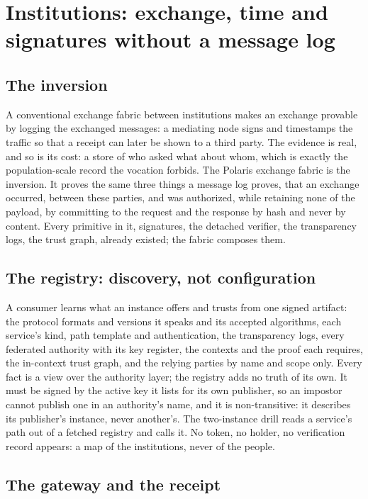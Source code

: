 \section{Institutions: exchange, time and signatures without a message log}
\label{sec:institutions}

\subsection{The inversion}

A conventional exchange fabric between institutions makes an exchange provable by logging the
exchanged messages: a mediating node signs and timestamps the traffic so that a receipt can later be
shown to a third party. The evidence is real, and so is its cost: a store of who asked what about
whom, which is exactly the population-scale record the vocation forbids. The Polaris exchange fabric
is the inversion. It proves the same three things a message log proves, that an exchange occurred,
between these parties, and was authorized, while retaining none of the payload, by committing to the
request and the response by hash and never by content. Every primitive in it, signatures, the
detached verifier, the transparency logs, the trust graph, already existed; the fabric composes them.
\sImpl

\subsection{The registry: discovery, not configuration}

A consumer learns what an instance offers and trusts from one signed artifact: the protocol formats
and versions it speaks and its accepted algorithms, each service's kind, path template and
authentication, the transparency logs, every federated authority with its key register, the
contexts and the proof each requires, the in-context trust graph, and the relying parties by name
and scope only. Every fact is a view over the authority layer; the registry adds no truth of its own.
It must be signed by the active key it lists for its own publisher, so an impostor cannot publish one
in an authority's name, and it is non-transitive: it describes its publisher's instance, never
another's. The two-instance drill reads a service's path out of a fetched registry and calls it. No
token, no holder, no verification record appears: a map of the institutions, never of the people.
\sImpl

\subsection{The gateway and the receipt}

